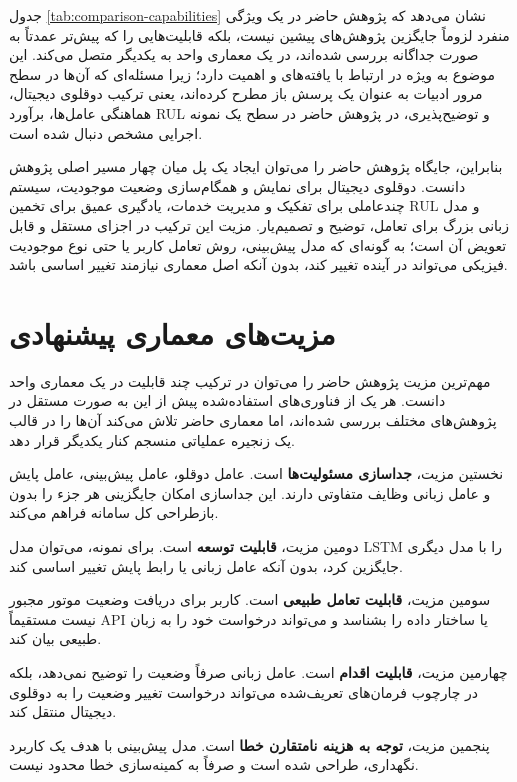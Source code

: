 جدول \ref{tab:comparison-capabilities} نشان می‌دهد که پژوهش حاضر
در یک ویژگی منفرد لزوماً جایگزین پژوهش‌های پیشین نیست، بلکه قابلیت‌هایی
را که پیش‌تر عمدتاً به صورت جداگانه بررسی شده‌اند، در یک معماری واحد
به یکدیگر متصل می‌کند. این موضوع به ویژه در ارتباط با یافته‌های
و
 اهمیت دارد؛ زیرا مسئله‌ای که آن‌ها در سطح مرور
ادبیات به عنوان یک پرسش باز مطرح کرده‌اند، یعنی ترکیب دوقلوی دیجیتال،
هماهنگی عامل‌ها، برآورد \gls{RUL} و توضیح‌پذیری، در پژوهش حاضر در سطح یک
نمونه اجرایی مشخص دنبال شده است.

بنابراین، جایگاه پژوهش حاضر را می‌توان ایجاد یک پل میان چهار مسیر
اصلی پژوهش دانست. دوقلوی دیجیتال برای نمایش و همگام‌سازی وضعیت
موجودیت، سیستم چندعاملی برای تفکیک و مدیریت خدمات، یادگیری عمیق برای
تخمین \gls{RUL} و مدل زبانی بزرگ برای تعامل، توضیح و تصمیم‌یار. مزیت این ترکیب در اجزای مستقل و قابل تعویض آن است؛ به گونه‌ای که مدل پیش‌بینی، روش تعامل کاربر یا حتی نوع موجودیت فیزیکی می‌تواند در آینده تغییر کند، بدون آنکه اصل معماری نیازمند تغییر اساسی باشد.




\section{مزیت‌های معماری پیشنهادی}
\label{sec:architecture-benefits}

مهم‌ترین مزیت پژوهش حاضر را می‌توان در ترکیب چند قابلیت در یک معماری واحد دانست. هر یک از فناوری‌های استفاده‌شده پیش از این به صورت مستقل در پژوهش‌های مختلف بررسی شده‌اند، اما معماری حاضر تلاش می‌کند آن‌ها را در قالب یک زنجیره عملیاتی منسجم کنار یکدیگر قرار دهد.

نخستین مزیت، \textbf{جداسازی مسئولیت‌ها} است. عامل دوقلو، عامل پیش‌بینی، عامل پایش و عامل زبانی وظایف متفاوتی دارند. این جداسازی امکان جایگزینی هر جزء را بدون بازطراحی کل سامانه فراهم می‌کند.

دومین مزیت، \textbf{قابلیت توسعه} است. برای نمونه، می‌توان مدل LSTM را با مدل دیگری جایگزین کرد، بدون آنکه عامل زبانی یا رابط پایش تغییر اساسی کند.

سومین مزیت، \textbf{قابلیت تعامل طبیعی} است. کاربر برای دریافت وضعیت موتور مجبور نیست مستقیماً API یا ساختار داده را بشناسد و می‌تواند درخواست خود را به زبان طبیعی بیان کند.

چهارمین مزیت، \textbf{قابلیت اقدام} است. عامل زبانی صرفاً وضعیت را توضیح نمی‌دهد، بلکه در چارچوب فرمان‌های تعریف‌شده می‌تواند درخواست تغییر وضعیت را به دوقلوی دیجیتال منتقل کند.

پنجمین مزیت، \textbf{توجه به هزینه نامتقارن خطا} است. مدل پیش‌بینی با هدف یک کاربرد نگهداری، طراحی شده است و صرفاً به کمینه‌سازی خطا محدود نیست.

